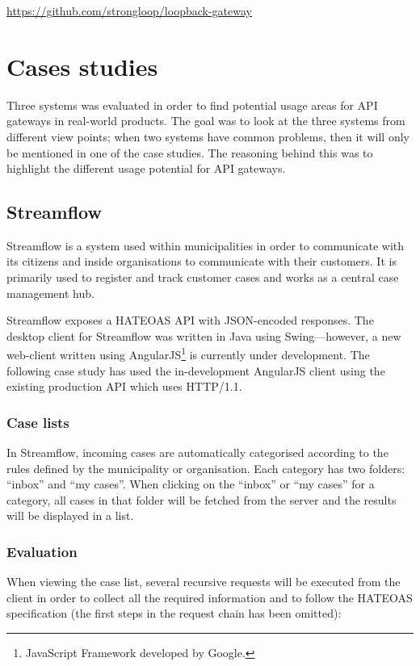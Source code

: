 \documentclass{cslthse-msc}
\begin{document}
\vspace{5mm}

\noindent \url{https://github.com/strongloop/loopback-gateway}

\chapter{Cases studies}

Three systems was evaluated in order to find potential usage areas for API gateways in real-world products. The goal was to look at the three systems from different view points; when two systems have common problems, then it will only be mentioned in one of the case studies. The reasoning behind this was to highlight the different usage potential for API gateways.

\section{Streamflow}
Streamflow\cite{streamflow} is a system used within municipalities in order to communicate with its citizens and inside organisations to communicate with their customers. It is primarily used to register and track customer cases and works as a central case management hub.

Streamflow exposes a HATEOAS API with JSON-encoded responses. The desktop client for Streamflow was written in Java using Swing---however, a new web-client written using AngularJS\footnote{JavaScript Framework developed by Google.} is currently under development. The following case study has used the in-development AngularJS client using the existing production API which uses HTTP/1.1.

\subsection{Case lists}
In Streamflow, incoming cases are automatically categorised according to the rules defined by the municipality or organisation. Each category has two folders: \enquote{inbox} and \enquote{my cases}. When clicking on the \enquote{inbox} or \enquote{my cases} for a category, all cases in that folder will be fetched from the server and the results will be displayed in a list.

\subsection{Evaluation}
When viewing the case list, several recursive requests will be executed from the client in order to collect all the required information and to follow the HATEOAS specification (the first steps in the request chain has been omitted):
\end{document}
